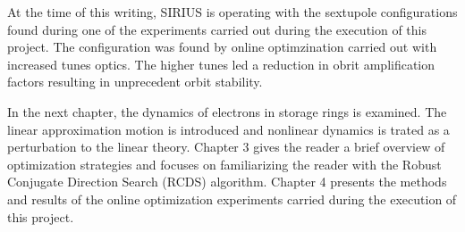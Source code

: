 At the time of this writing, SIRIUS is operating with the sextupole configurations found during one of the experiments carried out during the execution of this project. The configuration was found by online optimzination carried out with increased tunes optics. The higher tunes led a reduction in obrit amplification factors resulting in unprecedent orbit stability.

In the next chapter, the dynamics of electrons in storage rings is examined. The linear approximation motion is introduced and nonlinear dynamics is trated as a perturbation to the linear theory. Chapter 3 gives the reader a brief overview of optimization strategies and focuses on familiarizing the reader with the Robust Conjugate Direction Search (RCDS) algorithm. Chapter 4 presents the methods and results of the online optimization experiments carried during the execution of this project.

